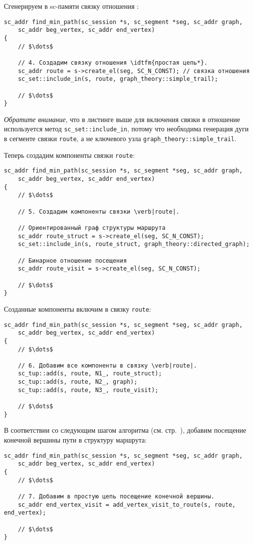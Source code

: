 Сгенерируем в sc-памяти связку отношения :
\begin{lstlisting}[texcl]
sc_addr find_min_path(sc_session *s, sc_segment *seg, sc_addr graph,
    sc_addr beg_vertex, sc_addr end_vertex)
{
    // $\dots$

    // 4. Создадим связку отношения \idtfm{простая цепь*}.
    sc_addr route = s->create_el(seg, SC_N_CONST); // связка отношения
    sc_set::include_in(s, route, graph_theory::simple_trail);

    // $\dots$
}
\end{lstlisting}

\emph{Обратите внимание}, что в листинге выше для включения связки в
отношение используется метод \lstinline|sc_set::include_in|, потому
что необходима генерация дуги в сегменте связки \lstinline|route|, а
не ключевого узла \lstinline|graph_theory::simple_trail|.

Теперь создадим компоненты связки \lstinline|route|:
\begin{lstlisting}[texcl]
sc_addr find_min_path(sc_session *s, sc_segment *seg, sc_addr graph,
    sc_addr beg_vertex, sc_addr end_vertex)
{
    // $\dots$

    // 5. Создадим компоненты связки \verb|route|.
    
    // Ориентированный граф структуры маршрута
    sc_addr route_struct = s->create_el(seg, SC_N_CONST);
    sc_set::include_in(s, route_struct, graph_theory::directed_graph);
    
    // Бинарное отношение посещения
    sc_addr route_visit = s->create_el(seg, SC_N_CONST);

    // $\dots$
}
\end{lstlisting}

Созданные компоненты включим в связку \lstinline|route|:
\begin{lstlisting}[texcl]
sc_addr find_min_path(sc_session *s, sc_segment *seg, sc_addr graph,
    sc_addr beg_vertex, sc_addr end_vertex)
{
    // $\dots$

    // 6. Добавим все компоненты в связку \verb|route|.
    sc_tup::add(s, route, N1_, route_struct);
    sc_tup::add(s, route, N2_, graph);
    sc_tup::add(s, route, N3_, route_visit);

    // $\dots$
}
\end{lstlisting}

В соответствии со следующим шагом алгоритма
(см. стр.~\pageref{S9_Add_end_vertex_visit_to_route_tuple}), добавим
посещение конечной вершины пути в структуру маршрута:
\begin{lstlisting}[texcl]
sc_addr find_min_path(sc_session *s, sc_segment *seg, sc_addr graph,
    sc_addr beg_vertex, sc_addr end_vertex)
{
    // $\dots$

    // 7. Добавим в простую цепь посещение конечной вершины.
    sc_addr end_vertex_visit = add_vertex_visit_to_route(s, route, end_vertex);

    // $\dots$
}
\end{lstlisting}

